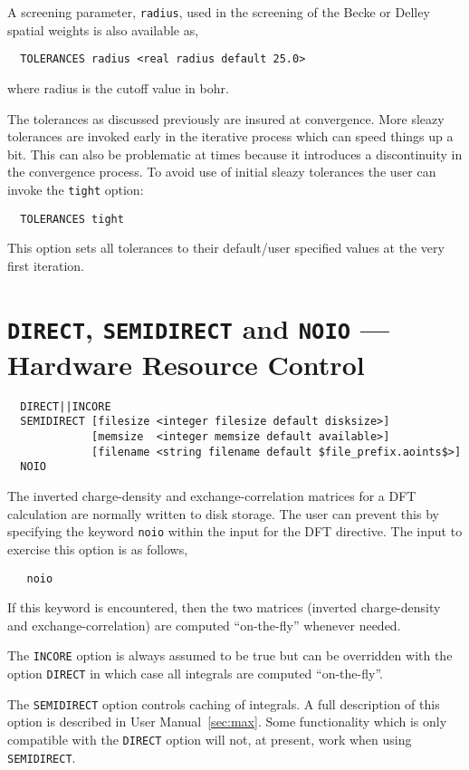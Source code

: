 A screening parameter, \verb+radius+, used in the screening of the
Becke or Delley spatial weights is also available as,
\begin{verbatim}
  TOLERANCES radius <real radius default 25.0>
\end{verbatim}
where radius is the cutoff value in bohr.

The tolerances as discussed previously are insured at convergence.
More sleazy tolerances are invoked early in the iterative process
which can speed things up a bit.  This can also be problematic at
times because it introduces a discontinuity in the convergence
process.  To avoid use of initial sleazy tolerances the user can
invoke the \verb+tight+ option:

\begin{verbatim}
  TOLERANCES tight 
\end{verbatim}

This option sets all tolerances to their
default/user specified values at the very first iteration.


\section{{\tt DIRECT}, {\tt SEMIDIRECT} and {\tt NOIO} --- Hardware Resource Control}
\begin{verbatim}
  DIRECT||INCORE
  SEMIDIRECT [filesize <integer filesize default disksize>]
             [memsize  <integer memsize default available>]
             [filename <string filename default $file_prefix.aoints$>]
  NOIO
\end{verbatim}

\sloppy

The inverted charge-density and exchange-correlation matrices
for a DFT calculation are normally written to disk storage.  The user
can prevent this by specifying the keyword \verb+noio+ within the
input for the DFT directive.  The input to exercise this option is
as follows,
\begin{verbatim}
   noio
\end{verbatim}
If this keyword is encountered, then the two matrices (inverted
charge-density and exchange-correlation) are computed ``on-the-fly''
whenever needed. 

The \verb+INCORE+ option is always assumed to be true but can be
overridden with the option \verb+DIRECT+ in which case all integrals
are computed ``on-the-fly''.

The \verb+SEMIDIRECT+ option controls caching of integrals.  A full 
description of this option is described in User Manual~\ref{sec:max}.
Some functionality which is only compatible with the \verb+DIRECT+
option will not, at present, work when using \verb+SEMIDIRECT+.

